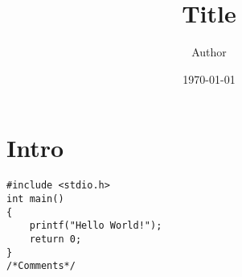 \documentclass[11pt, letterpaper]{article}
\author{Author}
\date{\today}
\title{Title}
\begin{document}
\maketitle
\newpage
\tableofcontents
\newpage
\section{Intro}
\begin{lstlisting}
#include <stdio.h>
int main()
{
    printf("Hello World!");
    return 0;
}
/*Comments*/
\end{lstlisting}
%
\end{document}
